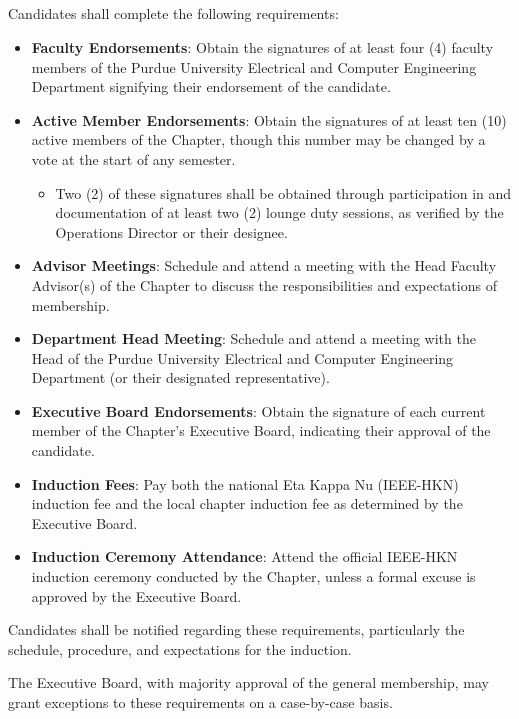\documentclass[10pt, oneside]{article}
\begin{document}
\subsection{ }
Candidates shall complete the following requirements:
\begin{itemize}
    \item \textbf{Faculty Endorsements}: Obtain the signatures of at least four (4) faculty members of the Purdue University Electrical and Computer Engineering Department signifying their endorsement of the candidate.
    \item \textbf{Active Member Endorsements}: Obtain the signatures of at least ten (10) active members of the Chapter, though this number may be changed by a vote at the start of any semester.
    \begin{itemize}
        \item Two (2) of these signatures shall be obtained through participation in and documentation of at least two (2) lounge duty sessions, as verified by the Operations Director or their designee.
    \end{itemize}
    \item \textbf{Advisor Meetings}: Schedule and attend a meeting with the Head Faculty Advisor(s) of the Chapter to discuss the responsibilities and expectations of membership.
    \item \textbf{Department Head Meeting}: Schedule and attend a meeting with the Head of the Purdue University Electrical and Computer Engineering Department (or their designated representative).
    \item \textbf{Executive Board Endorsements}: Obtain the signature of each current member of the Chapter's Executive Board, indicating their approval of the candidate.
    \item \textbf{Induction Fees}: Pay both the national Eta Kappa Nu (IEEE-HKN) induction fee and the local chapter induction fee as determined by the Executive Board.
    \item \textbf{Induction Ceremony Attendance}: Attend the official IEEE-HKN induction ceremony conducted by the Chapter, unless a formal excuse is approved by the Executive Board.
\end{itemize}
Candidates shall be notified regarding these requirements, particularly the schedule, procedure, and expectations for the induction.

The Executive Board, with majority approval of the general membership, may grant exceptions to these requirements on a case-by-case basis.
\end{document}
